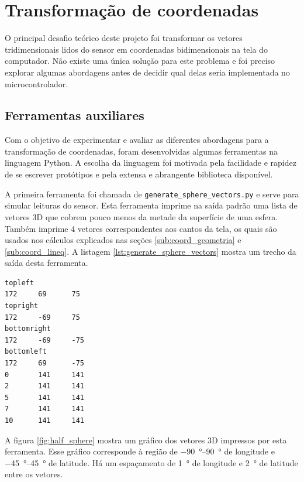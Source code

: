 \documentclass[brazil,pagestart=firstchapter]{abnt}
\begin{document}
\section{Transformação de coordenadas}
\label{sec:coordenadas}

O principal desafio teórico deste projeto foi transformar os vetores
tridimensionais lidos do sensor em coordenadas bidimensionais na tela do
computador. Não existe uma única solução para este problema e foi preciso
explorar algumas abordagens antes de decidir qual delas seria implementada
no microcontrolador.


\subsection{Ferramentas auxiliares}
\label{sub:ferramentas}

Com o objetivo de experimentar e avaliar as diferentes abordagens para a
transformação de coordenadas, foram desenvolvidas algumas ferramentas
na linguagem Python. A escolha da linguagem foi motivada pela facilidade e
rapidez de se escrever protótipos e pela extensa e abrangente biblioteca
disponível.

A primeira ferramenta foi chamada de \texttt{generate\_sphere\_vectors.py} e
serve para simular leituras do sensor. Esta ferramenta imprime na saída
padrão uma lista de vetores 3D que cobrem pouco menos da metade da
superfície de uma esfera. Também imprime 4 vetores correspondentes aos
cantos da tela, os quais são usados nos cálculos explicados nas seções
\ref{sub:coord_geometria} e \ref{sub:coord_lineq}. A listagem
\ref{lst:generate_sphere_vectors} mostra um trecho da saída desta
ferramenta.

\begin{lstlisting}[numbers=none, float=h, label={lst:generate_sphere_vectors},
caption={Primeiras linhas da saída do programa \texttt{generate\_sphere\_vectors.py}}
]
topleft
172     69      75
topright
172     -69     75
bottomright
172     -69     -75
bottomleft
172     69      -75
0       141     141
2       141     141
5       141     141
7       141     141
10      141     141
\end{lstlisting}

A figura \ref{fig:half_sphere} mostra um gráfico dos vetores 3D
impressos por esta ferramenta. Esse gráfico corresponde à região de
\SIrange{-90}{90}{\degree} de longitude e \SIrange{-45}{45}{\degree} de
latitude. Há um espaçamento de \SI{1}{\degree} de longitude e
\SI{2}{\degree} de latitude entre os vetores.
\end{document}

